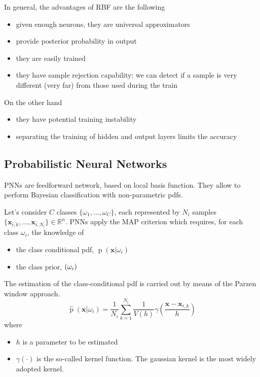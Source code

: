 \documentclass[oneside,onecolumn]{report}
\DeclareMathOperator*{\pdf}{p}
\let\P\relax
\DeclareMathOperator*{\P}{P}
\begin{document}
In general, the advantages of RBF are the following
\begin{itemize}
    \item given enough neurons, they are universal approximators
    \item provide posterior probability in output
    \item they are easily trained
    \item they have sample rejection capability: we can detect if a sample is very different (very far) from those used during the train
\end{itemize}

On the other hand
\begin{itemize}
    \item they have potential training instability
    \item separating the training of hidden and output layers limits the accuracy
\end{itemize}


\subsection{Probabilistic Neural Networks}
PNNs are feedforward network, based on local basis function.
They allow to perform Bayesian classification with non-parametric pdfs.

Let's consider $C$ classes $\{\omega_1, \dots, \omega_C\}$, each represented by $N_i$ samples $\{\bm x_{i,k}, \dots, \bm x_{i,N_i}\} \in \mathbb R^n$.
PNNs apply the MAP criterion which requires, for each class $\omega_i$, the knowledge of
\begin{itemize}
    \item the class conditional pdf, $\pdf(\bm x | \omega_i)$
    \item the class prior, $\P(\omega_i)$
\end{itemize}

The estimation of the class-conditional pdf is carried out by means of the Parzen window approach.
$$ \widehat{\pdf}(\bm x | \omega_i) = \frac{1}{N_i} \sum_{k = 1}^{N_i} \frac{1}{V(h)} \gamma\left( \frac{\bm x - \bm x_{i, k}}{h} \right) $$
where
\begin{itemize}
    \item $h$ is a parameter to be estimated
    \item $\gamma(\cdot)$ is the so-called kernel function.
    The gaussian kernel is the most widely adopted kernel.
\end{itemize}
\end{document}
